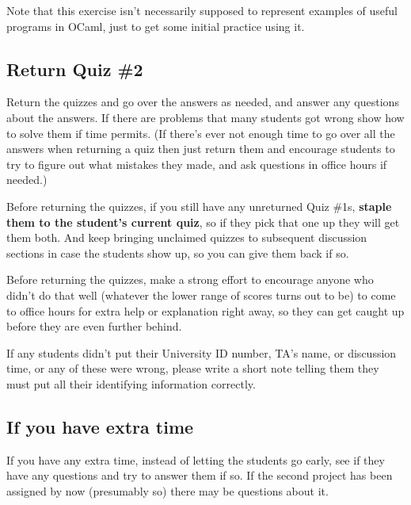 \documentclass[12pt]{article}
\begin{document}
      Note that this exercise isn't necessarily supposed to represent examples
    of useful programs in OCaml, just to get some initial practice using it.

    \subsection{Return Quiz \#2}

      Return the quizzes and go over the answers as needed, and answer any
    questions about the answers.  If there are problems that many students
    got wrong show how to solve them if time permits.  (If there's ever not
    enough time to go over all the answers when returning a quiz then just
    return them and encourage students to try to figure out what mistakes
    they made, and ask questions in office hours if needed.)

      Before returning the quizzes, if you still have any unreturned Quiz
    \#1s, \textbf{staple them to the student's current quiz}, so if they
    pick that one up they will get them both.  And keep bringing unclaimed
    quizzes to subsequent discussion sections in case the students show up,
    so you can give them back if so.

      Before returning the quizzes, make a strong effort to encourage anyone
    who didn't do that well (whatever the lower range of scores turns out to
    be) to come to office hours for extra help or explanation right away, so
    they can get caught up before they are even further behind.

      If any students didn't put their University ID number, TA's name, or
    discussion time, or any of these were wrong, please write a short note
    telling them they must put all their identifying information correctly.

    \subsection{If you have extra time}
  
      If you have any extra time, instead of letting the students go early,
    see if they have any questions and try to answer them if so.  If the
    second project has been assigned by now (presumably so) there may be
    questions about it.
\end{document}
